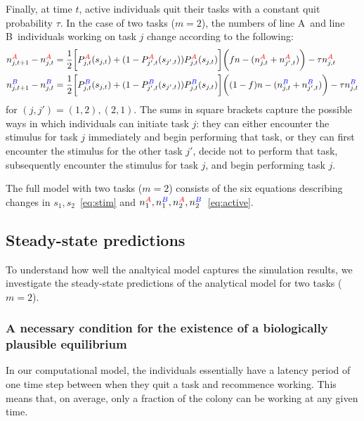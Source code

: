 \documentclass[11pt]{article}
\newcommand{\A}{{\color{red}A}}
\newcommand{\B}{{\color{blue}B}}
\begin{document}
\begin{appendices}
Finally, at time $t$, active individuals quit their tasks with a constant quit probability $\tau$. In the case of two tasks ($m = 2$), the numbers of line \A\ and line \B\ individuals working on task $j$ change according to the following:
\begin{align}
    n_{j,t+1}^{\A} - n_{j,t}^{\A}  & =  \frac{1}{2} \bigg[ P_{j,t}^{\A}(s_{j,t}) + (1 - P_{j',t}^{\A}(s_{j',t}))P_{j,t}^{\A}(s_{j,t})\bigg] \bigg( fn
 - (n_{j,t}^{\A} + n_{j',t}^{\A}) \bigg) - \tau n_{j,t}^{\A} \nonumber\\
    n_{j,t+1}^{\B} - n_{j,t}^{\B}  & = \frac{1}{2} \bigg[ P_{j,t}^{\B}(s_{j,t}) + (1 - P_{j',t}^{\B}(s_{j',t}))P_{j,t}^{\B}(s_{j,t})\bigg] \bigg( (1-f)n - (n_{j,t}^{\B} + n_{j',t}^{\B}) \bigg) - \tau n_{j,t}^{\B} \label{eq:active}
\end{align}
for $(j,j')=(1,2), (2,1)$. {\color{black}The sums in square brackets capture the possible ways in which individuals can initiate task $j$: they can either encounter the stimulus for task $j$ immediately and begin performing that task, or they can first encounter the stimulus for the other task $j'$, decide not to perform that task, subsequently encounter the stimulus for task $j$, and begin performing task $j$.}

The full model with two tasks ($m=2$) consists of the six equations describing changes in $s_1, s_2$~\eqref{eq:stim} and $ n_1^{\A}, n_1^{\B}, n_2^{\A}, n_2^{\B}$~\eqref{eq:active}. 

\subsection{Steady-state predictions}
To understand how well the analtyical model captures the simulation results, we investigate the steady-state predictions of the analytical model for two tasks ($m=2$).

\subsubsection{A necessary condition for the existence of a biologically plausible equilibrium} \label{sec:maxactivity}

In our computational model, the individuals essentially have a latency period of one time step between when they quit a task and recommence working. This means that, on average, only a fraction of the colony can be working at any given time.


\end{appendices}
\end{document}
